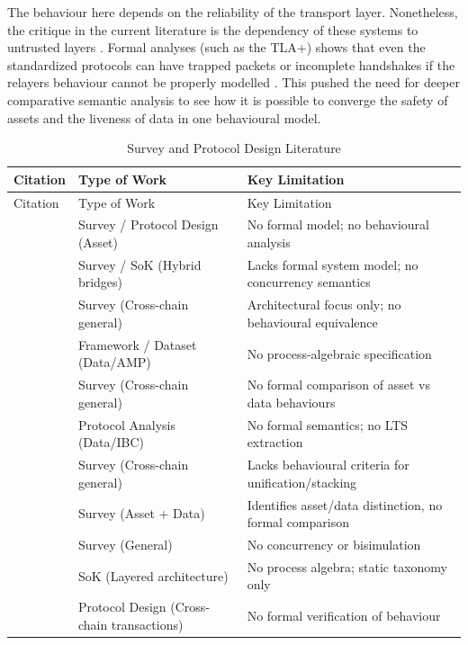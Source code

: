 The behaviour here depends on the reliability of the transport layer.
Nonetheless, the critique in the current literature is the dependency of
these systems to untrusted layers \citep{Wei_2023}
\citep{Delgado_von_Eitzen_2025}. Formal analyses (such as the TLA+)
shows that even the standardized protocols can have trapped packets or
incomplete handshakes if the relayers\textquotesingle{} behaviour cannot
be properly modelled \citep{Wei_2023}. This pushed the need for deeper
comparative semantic analysis to see how it is possible to converge the
safety of assets and the liveness of data in one behavioural model.

\begin{longtable}[]{@{}lll@{}}
\caption{Survey and Protocol Design Literature}\tabularnewline
\toprule\noalign{}
Citation & Type of Work & Key Limitation \\
\midrule\noalign{}
\endfirsthead
\toprule\noalign{}
Citation & Type of Work & Key Limitation \\
\midrule\noalign{}
\endhead
\bottomrule\noalign{}
\endlastfoot
\citep{soureshjani2026} & Survey / Protocol Design (Asset) & No formal
model; no behavioural analysis \\
\citep{Notland_2026} & Survey / SoK (Hybrid bridges) & Lacks formal
system model; no concurrency semantics \\
\citep{Caetano_da_Silva_2025} & Survey (Cross-chain general) &
Architectural focus only; no behavioural equivalence \\
\citep{augusto2025} & Framework / Dataset (Data/AMP) & No
process-algebraic specification \\
\citep{Li2025} & Survey (Cross-chain general) & No formal comparison of
asset vs data behaviours \\
\citep{Delgado_von_Eitzen_2025} & Protocol Analysis (Data/IBC) & No
formal semantics; no LTS extraction \\
\citep{kishore2025interoperability} & Survey (Cross-chain general) &
Lacks behavioural criteria for unification/stacking \\
\citep{deng2025} & Survey (Asset + Data) & Identifies asset/data
distinction, no formal comparison \\
\citep{A_Alzahrani_2025} & Survey (General) & No concurrency or
bisimulation \\
\citep{Hassan_2025} & SoK (Layered architecture) & No process algebra;
static taxonomy only \\
\citep{Kumar_2025} & Protocol Design (Cross-chain transactions) & No
formal verification of behaviour \\

\end{longtable}
